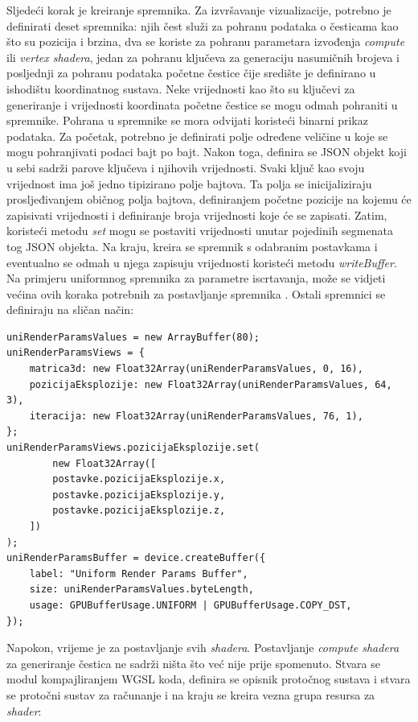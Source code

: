 \documentclass{foi}
\begin{document}
Sljedeći korak je kreiranje spremnika. Za izvršavanje vizualizacije, potrebno je definirati deset spremnika: njih čest služi za pohranu podataka o česticama kao što su pozicija i brzina, dva se koriste za pohranu parametara izvođenja \textit{compute} ili \textit{vertex shadera}, jedan za pohranu ključeva za generaciju nasumičnih brojeva i posljednji za pohranu podataka početne čestice čije središte je definirano u ishodištu koordinatnog sustava. Neke vrijednosti kao što su ključevi za generiranje i vrijednosti koordinata početne čestice se mogu odmah pohraniti u spremnike. Pohrana u spremnike se mora odvijati koristeći binarni prikaz podataka. Za početak, potrebno je definirati polje određene veličine u koje se mogu pohranjivati podaci bajt po bajt. Nakon toga, definira se JSON objekt koji u sebi sadrži parove ključeva i njihovih vrijednosti. Svaki ključ kao svoju vrijednost ima još jedno tipizirano polje bajtova. Ta polja se inicijaliziraju prosljeđivanjem običnog polja bajtova, definiranjem početne pozicije na kojemu će zapisivati vrijednosti i definiranje broja vrijednosti koje će se zapisati. Zatim, koristeći metodu \textit{set} mogu se postaviti vrijednosti unutar pojedinih segmenata tog JSON objekta. Na kraju, kreira se spremnik s odabranim postavkama i eventualno se odmah u njega zapisuju vrijednosti koristeći metodu \textit{writeBuffer}. Na primjeru uniformnog spremnika za parametre iscrtavanja, može se vidjeti većina ovih koraka potrebnih za postavljanje spremnika  \parencite{WebGPUFundamentalsCopyData}. Ostali spremnici se definiraju na sličan način:
\begin{verbatim}
uniRenderParamsValues = new ArrayBuffer(80);
uniRenderParamsViews = {
	matrica3d: new Float32Array(uniRenderParamsValues, 0, 16),
	pozicijaEksplozije: new Float32Array(uniRenderParamsValues, 64, 3),
	iteracija: new Float32Array(uniRenderParamsValues, 76, 1),
};
uniRenderParamsViews.pozicijaEksplozije.set(
		new Float32Array([
		postavke.pozicijaEksplozije.x,
		postavke.pozicijaEksplozije.y,
		postavke.pozicijaEksplozije.z,
	])
);
uniRenderParamsBuffer = device.createBuffer({
	label: "Uniform Render Params Buffer",
	size: uniRenderParamsValues.byteLength,
	usage: GPUBufferUsage.UNIFORM | GPUBufferUsage.COPY_DST,
});
\end{verbatim}

Napokon, vrijeme je za postavljanje svih \textit{shadera}. Postavljanje \textit{compute shadera} za generiranje čestica ne sadrži ništa što već nije prije spomenuto. Stvara se modul kompajliranjem WGSL koda, definira se opisnik protočnog sustava i stvara se protočni sustav za računanje i na kraju se kreira vezna grupa resursa za \textit{shader}:
\end{document}
